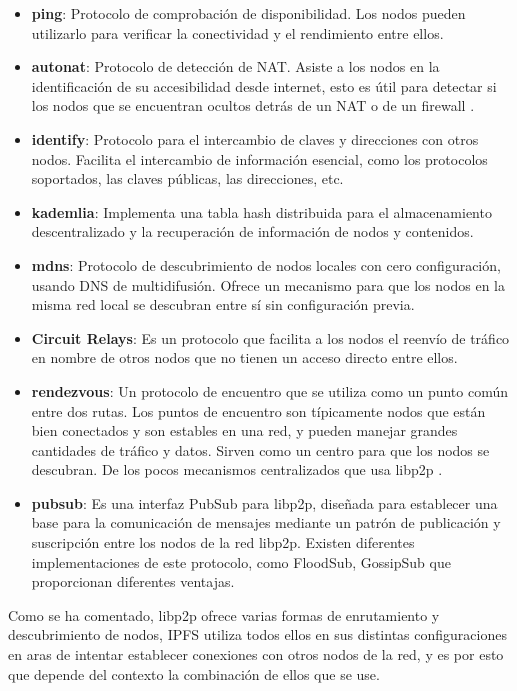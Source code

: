 \begin{itemize}
      \item \textbf{ping}: Protocolo de comprobación de disponibilidad. Los nodos pueden utilizarlo para verificar la conectividad y el rendimiento entre ellos.
      \item \textbf{autonat}: Protocolo de detección de NAT. Asiste a los nodos en la identificación de su accesibilidad desde internet, esto es útil para detectar si los nodos que se encuentran ocultos detrás de un NAT o de un firewall \cite{AutoNAT}.
      \item \textbf{identify}: Protocolo para el intercambio de claves y direcciones con otros nodos. Facilita el intercambio de información esencial, como los protocolos soportados, las claves públicas, las direcciones, etc.
      \item \textbf{kademlia}: Implementa una tabla hash distribuida para el almacenamiento descentralizado y la recuperación de información de nodos y contenidos.
      \item \textbf{mdns}: Protocolo de descubrimiento de nodos locales con cero configuración, usando DNS de multidifusión. Ofrece un mecanismo para que los nodos en la misma red local se descubran entre sí sin configuración previa.
      \item \textbf{Circuit Relays}: Es un protocolo que facilita a los nodos el reenvío de tráfico en nombre de otros nodos que no tienen un acceso directo entre ellos\cite{CircuitRelay}.
      \item \textbf{rendezvous}: Un protocolo de encuentro que se utiliza como un punto común entre dos rutas.
            Los puntos de encuentro son típicamente nodos que están bien conectados y son estables en una red, y pueden manejar grandes cantidades de tráfico y datos. Sirven como un centro para que los nodos se descubran. De los pocos mecanismos centralizados que usa libp2p \cite{Rendezvous}.
      \item \textbf{pubsub}: Es una interfaz PubSub para libp2p, diseñada para establecer una base para la comunicación de mensajes mediante un patrón de publicación y suscripción entre los nodos de la red libp2p. Existen diferentes implementaciones de este protocolo, como FloodSub, GossipSub que proporcionan
            diferentes ventajas.
\end{itemize}

Como se ha comentado, libp2p ofrece varias formas de enrutamiento y descubrimiento de nodos, IPFS utiliza todos ellos en sus distintas
configuraciones en aras de intentar establecer conexiones con otros nodos de la red, y es por esto que depende del contexto la combinación
de ellos que se use.

